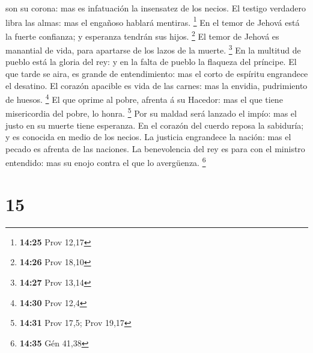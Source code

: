 son su corona: mas es infatuación la insensatez de los necios.
 El testigo verdadero libra las almas: mas el engañoso
hablará mentiras. \footnote{\textbf{14:25} Prov 12,17} 
En el temor de Jehová está la fuerte confianza; y esperanza tendrán sus
hijos. \footnote{\textbf{14:26} Prov 18,10}  El temor de
Jehová es manantial de vida, para apartarse de los lazos de la muerte.
\footnote{\textbf{14:27} Prov 13,14}  En la multitud de
pueblo está la gloria del rey: y en la falta de pueblo la flaqueza del
príncipe.  El que tarde se aira, es grande de
entendimiento: mas el corto de espíritu engrandece el desatino.
 El corazón apacible es vida de las carnes: mas la
envidia, pudrimiento de huesos. \footnote{\textbf{14:30} Prov 12,4}
 El que oprime al pobre, afrenta á su Hacedor: mas el que
tiene misericordia del pobre, lo honra. \footnote{\textbf{14:31} Prov
  17,5; Prov 19,17}  Por su maldad será lanzado el impío:
mas el justo en su muerte tiene esperanza.  En el corazón
del cuerdo reposa la sabiduría; y es conocida en medio de los necios.
 La justicia engrandece la nación: mas el pecado es
afrenta de las naciones.  La benevolencia del rey es para
con el ministro entendido: mas su enojo contra el que lo avergüenza.
\footnote{\textbf{14:35} Gén 41,38}

\hypertarget{section-14}{%
\section{15}\label{section-14}}

